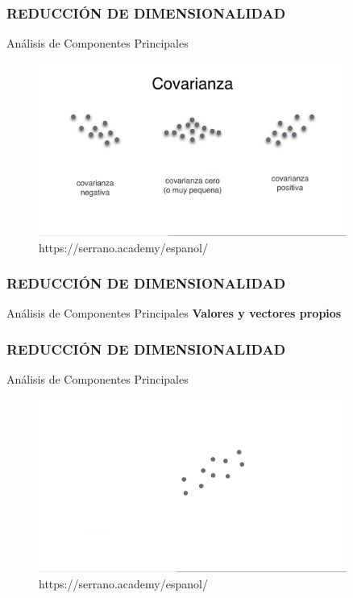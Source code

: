 \documentclass{beamer}
\begin{document}
\begin{frame}
	\frametitle{REDUCCIÓN DE DIMENSIONALIDAD}
	\begin{block}{Análisis de Componentes Principales}	
		\begin{figure}
			\includegraphics[width=0.9\textwidth]{PCA/IMG_3560.jpg}
			\caption{https://serrano.academy/espanol/}
		\end{figure}
	\end{block}
\end{frame}


\begin{frame}
	\frametitle{REDUCCIÓN DE DIMENSIONALIDAD}
\begin{block}{Análisis de Componentes Principales}	
\textbf{Valores y vectores propios}
\end{block}
\end{frame}

\begin{frame}
\frametitle{REDUCCIÓN DE DIMENSIONALIDAD}
\begin{block}{Análisis de Componentes Principales}	
	\begin{figure}
		\includegraphics[width=0.9\textwidth]{PCA/IMG_3562.jpg}
		\caption{https://serrano.academy/espanol/}
	\end{figure}
\end{block}
\end{frame}
\end{document}
